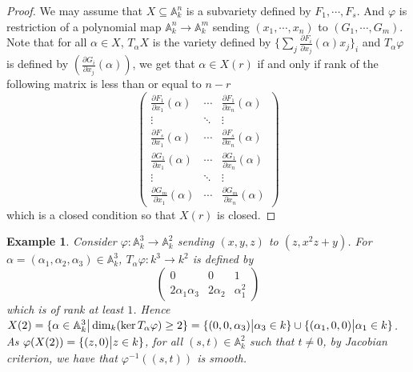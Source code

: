 \documentclass{ctexart}
\newtheorem{example}{Example}[section]
\begin{document}
\begin{proof}
    We may assume that $X \subseteq \mathbb{A}_{k}^{n}$ is a subvariety defined by $F_{1}, \cdots, F_{s}$.
    And $\varphi$ is restriction of a polynomial map $\mathbb{A}_{k}^{n} \rightarrow \mathbb{A}_{k}^{m}$ sending $(x_{1}, \cdots, x_{n})$ to $(G_{1}, \cdots, G_{m})$.
    Note that for all $\alpha\in X$, $T_{\alpha}X$ is the variety defined by $\{\sum_{j} \frac{\partial F_{i}}{\partial x_{j}}(\alpha)x_{j}\}_{i}$ and $T_{\alpha}\varphi$ is defined by $(\frac{\partial G_{i}}{\partial x_{j}}(\alpha))$,
    we get that $\alpha\in X(r)$ if and only if rank of the following matrix is less than or equal to $n - r$
    \begin{equation}
        \begin{pmatrix}
            \frac{\partial F_{1}}{\partial x_{1}}(\alpha) & \cdots & \frac{\partial F_{1}}{\partial x_{n}}(\alpha) \\
            \vdots & \ddots & \vdots \\
            \frac{\partial F_{s}}{\partial x_{1}}(\alpha) & \cdots & \frac{\partial F_{s}}{\partial x_{n}}(\alpha) \\
            \frac{\partial G_{1}}{\partial x_{1}}(\alpha) & \cdots & \frac{\partial G_{1}}{\partial x_{n}}(\alpha) \\
            \vdots & \ddots & \vdots \\
            \frac{\partial G_{m}}{\partial x_{1}}(\alpha) & \cdots & \frac{\partial G_{m}}{\partial x_{n}}(\alpha)
        \end{pmatrix}
    \end{equation}
    which is a closed condition so that $X(r)$ is closed.
\end{proof}
\begin{example}
    Consider $\varphi: \mathbb{A}_{k}^{3} \rightarrow \mathbb{A}_{k}^{2}$ sending $(x, y, z)$ to $(z, x^{2}z + y)$.
    For $\alpha = (\alpha_{1}, \alpha_{2}, \alpha_{3})\in \mathbb{A}_{k}^{3}$, $T_{\alpha}\varphi: k^{3} \rightarrow k^{2}$ is defined by
    \begin{equation}
        \begin{pmatrix}
            0 & 0 & 1 \\
            2\alpha_{1}\alpha_{3} & 2\alpha_{2} & \alpha_{1}^{2}
        \end{pmatrix}
    \end{equation}
    which is of rank at least $1$.
    Hence $X(2) = \{\alpha\in \mathbb{A}_{k}^{3} \big{|} \dim_{k} (\ker T_{\alpha}\varphi) \ge 2\} = \{(0, 0, \alpha_{3}) \big{|} \alpha_{3}\in k\} \cup \{(\alpha_{1}, 0, 0) \big{|} \alpha_{1}\in k\}$.
    As $\varphi(X(2)) = \{(z, 0) \big{|} z\in k\}$, for all $(s, t)\in \mathbb{A}_{k}^{2}$ such that $t \neq 0$,
    by Jacobian criterion, we have that $\varphi^{-1}((s, t))$ is smooth.
\end{example}
\end{document}
